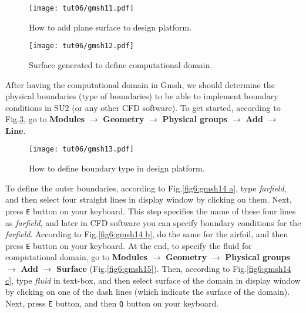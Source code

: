 \begin{figure}[htbp]
    \centering
    \texttt{[image: tut06/gmsh11.pdf]}
    \caption{How to add plane surface to design platform.}
    \label{fig6:gmsh11}
\end{figure}
\begin{figure}[htbp]
    \centering
    \texttt{[image: tut06/gmsh12.pdf]}
    \caption{Surface generated to define computational domain.}
    \label{fig6:gmsh12}
\end{figure}
After having the computational domain in Gmsh, we should determine the physical boundaries (type of boundaries) to be able to implement boundary conditions in SU2 (or any other CFD software). To get started, according to Fig.\ref{fig6:gmsh13}, go to \textbf{Modules} $\rightarrow$ \textbf{Geometry} $\rightarrow$ \textbf{Physical groups} $\rightarrow$ \textbf{Add} $\rightarrow$ \textbf{Line}.
\begin{figure}[htbp]
    \centering
    \texttt{[image: tut06/gmsh13.pdf]}
    \caption{How to define boundary type in design platform.}
    \label{fig6:gmsh13}
\end{figure}
To define the outer boundaries, according to Fig.\ref{fig6:gmsh14 a}, type \textit{farfield}, and then select four straight lines in display window by clicking on them. Next, press \texttt{E} button on your keyboard. This step specifies the name of these four lines as \textit{farfield}, and later in CFD software you can specify boundary conditions for the \textit{farfield}. According to Fig.\ref{fig6:gmsh14 b}, do the same for the airfoil, and then press \texttt{E} button on your keyboard. At the end, to specify the fluid for computational domain, go to \textbf{Modules} $\rightarrow$ \textbf{Geometry} $\rightarrow$ \textbf{Physical groups} $\rightarrow$ \textbf{Add} $\rightarrow$ \textbf{Surface} (Fig.\ref{fig6:gmsh15}). Then, according to Fig.\ref{fig6:gmsh14 c}, type \textit{fluid} in text-box, and then select surface of the domain in display window by clicking on one of the dash lines (which indicate the surface of the domain). Next, press \texttt{E} button, and then \texttt{Q} button on your keyboard.
